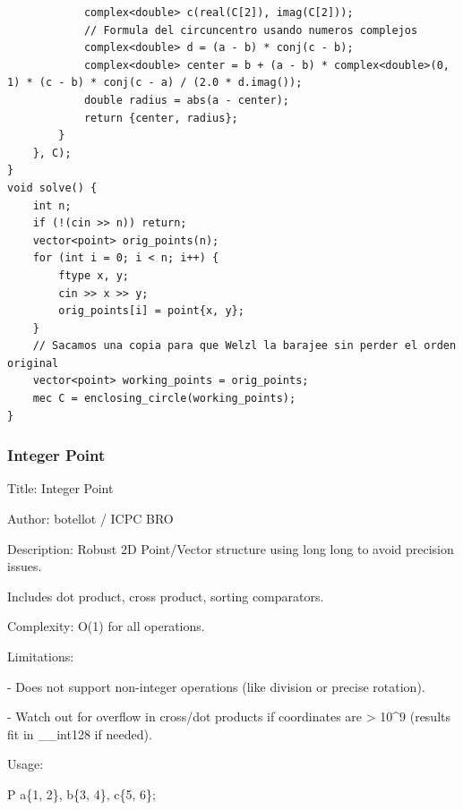 \documentclass[10pt,landscape,twocolumn]{article}
\begin{document}
\begin{lstlisting}
            complex<double> c(real(C[2]), imag(C[2]));
            // Formula del circuncentro usando numeros complejos
            complex<double> d = (a - b) * conj(c - b);
            complex<double> center = b + (a - b) * complex<double>(0, 1) * (c - b) * conj(c - a) / (2.0 * d.imag());
            double radius = abs(a - center);
            return {center, radius};
        }
    }, C);
}
void solve() {
    int n;
    if (!(cin >> n)) return;
    vector<point> orig_points(n);
    for (int i = 0; i < n; i++) {
        ftype x, y;
        cin >> x >> y;
        orig_points[i] = point{x, y};
    }
    // Sacamos una copia para que Welzl la barajee sin perder el orden original
    vector<point> working_points = orig_points;
    mec C = enclosing_circle(working_points);
}
\end{lstlisting}

\subsubsection{Integer Point}
\begin{flushleft}
\footnotesize\ttfamily
\par\noindent Title: Integer Point
\par\noindent Author: botellot / ICPC BRO
\par\noindent Description: Robust 2D Point/Vector structure using long long to avoid precision issues.
\par\noindent Includes dot product, cross product, sorting comparators.
\par\noindent Complexity: O(1) for all operations.
\par\noindent Limitations:
\par\noindent - Does not support non-integer operations (like division or precise rotation).
\par\noindent - Watch out for overflow in cross/dot products if coordinates are \textgreater{} 10\textasciicircum{}9 (results fit in \_\_int128 if needed).
\par\noindent Usage:
\par\noindent P a\{1, 2\}, b\{3, 4\}, c\{5, 6\};
\end{flushleft}
\end{document}
